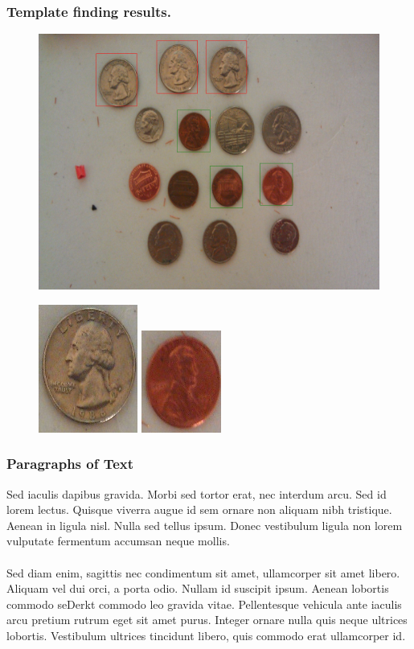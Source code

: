 \documentclass{beamer}
\begin{document}
\begin{frame}
\frametitle{Template finding results.}
 \begin{figure}
     \includegraphics[width=0.4\linewidth]{foundtemplates.png}
 \end{figure}
 \begin{figure}
     \includegraphics[width=0.1\linewidth]{template1.png}
     \quad
     \includegraphics[width=0.1\linewidth]{template2.png}
 \end{figure}
\end{frame}

\begin{frame}
  \frametitle{Paragraphs of Text}
  Sed iaculis dapibus gravida. Morbi sed tortor erat, nec interdum arcu. Sed id lorem lectus. Quisque viverra augue id sem ornare non aliquam nibh tristique. Aenean in ligula nisl. Nulla sed tellus ipsum. Donec vestibulum ligula non lorem vulputate fermentum accumsan neque mollis.\\~\\

  Sed diam enim, sagittis nec condimentum sit amet, ullamcorper sit
  amet libero. Aliquam vel dui orci, a porta odio. Nullam id suscipit
  ipsum. Aenean lobortis commodo seDerkt commodo leo gravida
  vitae. Pellentesque vehicula ante iaculis arcu pretium rutrum eget
  sit amet purus. Integer ornare nulla quis neque ultrices
  lobortis. Vestibulum ultrices tincidunt libero, quis commodo erat
  ullamcorper id.
\end{frame}

\end{document}
